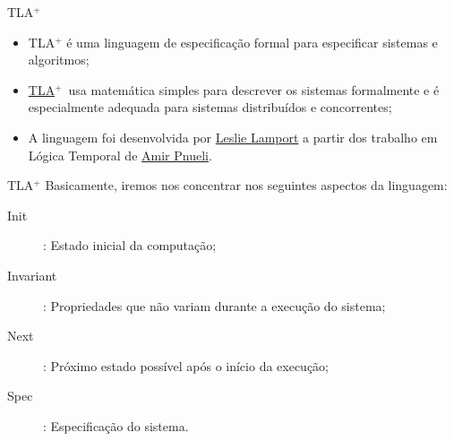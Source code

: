 \def\comment#1{{\hfil\scriptsize\color{gray}(* #1 *)}}
\def\tla{TLA$^+$}


\lecturetitle{\course}{\insertlecture}

\frame{\maketitle}

\begin{frame}{\tla}
  \begin{itemize}
  \item<1,4> \alert{\tla} é uma linguagem de especificação formal para especificar sistemas
    e algoritmos;
  \item<2,4> \href{https://lamport.azurewebsites.net/tla/tla.html}{\tla}~usa matemática simples para descrever os sistemas formalmente e é
    especialmente adequada para sistemas distribuídos e concorrentes;
  \item<3,4> A linguagem foi desenvolvida por
    \href{http://www.lamport.org/}{Leslie Lamport} a partir dos
    trabalho em Lógica Temporal de
    \href{https://cs.nyu.edu/faculty/pnueli/}{Amir Pnueli}.
  \end{itemize}
\end{frame}

\begin{frame}{\tla}{}
  Basicamente, iremos nos concentrar nos seguintes aspectos da linguagem:

  \begin{description}
  \item[Init]: Estado inicial da computação;
  \item[Invariant]: Propriedades que não variam durante a execução do sistema;
  \item[Next]: Próximo estado possível após o início da execução;
  \item[Spec]: Especificação do sistema.
  \end{description}
  
  
\end{frame}


